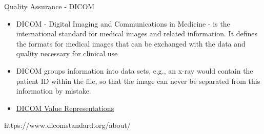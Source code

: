 \documentclass[10pt, xcolor=table]{beamer}
\begin{document}
\begin{frame}{Quality Assurance - DICOM}
	\begin{itemize}
		\item DICOM - Digital Imaging and Communications in Medicine - is the international standard for medical images and related information. It defines the formats for medical images that can be exchanged with the data and quality necessary for clinical use
		\item DICOM groups information into data sets, e.g., an x-ray would contain the patient ID within the file, so that the image can never be separated from this information by mistake.
		\item \href{http://dicom.nema.org/medical/dicom/current/output/chtml/part05/sect_6.2.html\#table_6.2-1}{\color{blue}DICOM Value Representations}
	\end{itemize}
	
	\scriptsize{https://www.dicomstandard.org/about/}
\end{frame}
\end{document}
